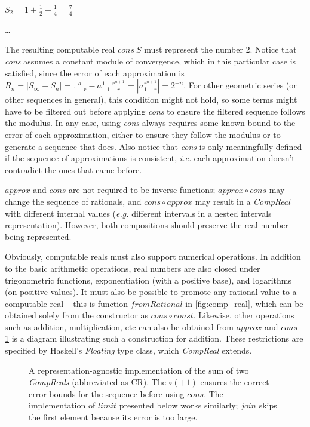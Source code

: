 $S_2 = 1 + \frac{1}{2} + \frac{1}{4} = \frac{7}{4}$

\dots

The resulting computable real $cons\ S$ must represent the number $2$. Notice that \textit{cons} assumes a constant module of convergence, which in this particular case is satisfied, since the error of each approximation is $R_n = | S_{\infty} - S_n | = \frac{a}{1-r} - a\frac{1-r^{n+1}}{1-r} = |a\frac{r^{n+1}}{1-r}|=2^{-n}$. For other geometric series (or other sequences in general), this condition might not hold, so some terms might have to be filtered out before applying \textit{cons} to ensure the filtered sequence follows the modulus. In any case, using \textit{cons} always requires some known bound to the error of each approximation, either to ensure they follow the modulus or to generate a sequence that does. Also notice that \textit{cons} is only meaningfully defined if the sequence of approximations is consistent, \textit{i.e.} each approximation doesn't contradict the ones that came before.

$approx$ and $cons$ are not required to be inverse functions; $approx \circ cons$ may change the sequence of rationals, and $cons \circ approx$ may result in a \textit{CompReal} with different internal values (\textit{e.g.} different intervals in a nested intervals representation). However, both compositions should preserve the real number being represented.

Obviously, computable reals must also support numerical operations. In addition to the basic arithmetic operations, real numbers are also closed under trigonometric functions, exponentiation (with a positive base), and logarithms (on positive values). It must also be possible to promote any rational value to a computable real -- this is function $fromRational$ in \cref{fig:comp_real}, which can be obtained solely from the constructor as $cons \circ const$. Likewise, other operations such as addition, multiplication, etc can also be obtained from $approx$ and $cons$ -- \cref{fig:sum} is a diagram illustrating such a construction for addition. These restrictions are specified by Haskell's \textit{Floating} type class, which \textit{CompReal} extends.

\begin{figure}[h]
    \centering
    
    \caption{A representation-agnostic implementation of the sum of two \textit{CompReals} (abbreviated as CR). The $\circ(+1)$ ensures the correct error bounds for the sequence before using $cons$. The implementation of $limit$ presented below works similarly; $join$ skips the first element because its error is too large.}
    \label{fig:sum}
\end{figure}

